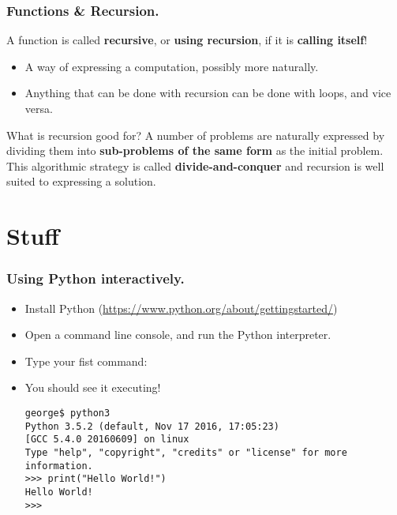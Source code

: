 \documentclass{beamer} %
\newcommand\emc[1]{\textcolor{brightblue}{\textbf{#1}}}
\begin{document}
\begin{frame}
\frametitle{Functions \& Recursion.}

A function is called \emc{recursive}, or \emc{using recursion}, if it is \emc{calling itself}!
\begin{itemize}
	\item A way of expressing a computation, possibly more naturally.
	\item Anything that can be done with recursion can be done with loops, and vice versa.
\end{itemize}

\begin{block}{What is recursion good for?}
A number of problems are naturally expressed by dividing them into \emc{sub-problems of the same form} as the initial problem. This algorithmic strategy is called \emc{divide-and-conquer} and recursion is well suited to expressing a solution.
\end{block}

\end{frame}



\section{Stuff}

\begin{frame}[fragile]
\frametitle{Using Python interactively.} 

\begin{itemize}
	\item Install Python (\url{https://www.python.org/about/gettingstarted/})
	\item Open a command line console, and run the Python interpreter.
	\item Type your fist command: 
	\item You should see it executing!

\begin{Verbatim}[fontsize=\footnotesize]
george$ python3
Python 3.5.2 (default, Nov 17 2016, 17:05:23) 
[GCC 5.4.0 20160609] on linux
Type "help", "copyright", "credits" or "license" for more information.
>>> print("Hello World!")
Hello World!
>>>
\end{Verbatim}

\end{itemize}

\end{frame}




\end{document}
